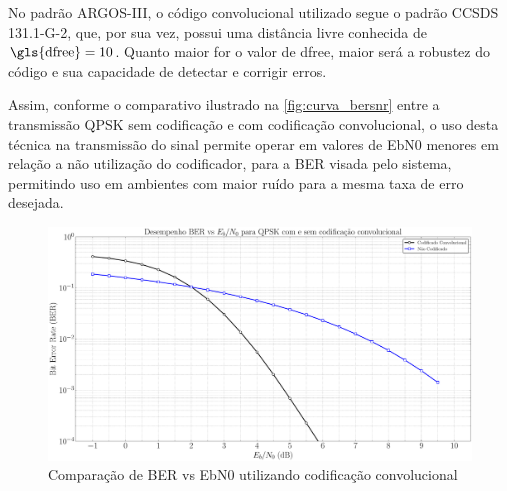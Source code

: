 No padrão \gls{ARGOS-III}, o código convolucional utilizado segue o padrão \gls{CCSDS} 131.1-G-2, que, por sua vez, possui uma distância livre conhecida de $\text{\gls{dfree}} = 10$. Quanto maior for o valor de \gls{dfree}, maior será a robustez do código e sua capacidade de detectar e corrigir erros.

\noindent Assim, conforme o comparativo ilustrado na \autoref{fig:curva_bersnr} entre a transmissão \gls{QPSK} sem codificação e com codificação convolucional, o uso desta técnica na transmissão do sinal permite operar em valores de \gls{EbN0} menores em relação a não utilização do codificador, para a \gls{BER} visada pelo sistema, permitindo uso em ambientes com maior ruído para a mesma taxa de erro desejada.

\begin{figure}[H]
	\centering
	\caption{Comparação de BER vs \gls{EbN0} utilizando codificação convolucional}\label{fig:curva_bersnr}
	\includegraphics[width=\linewidth]{assets/cap2/bersnr.pdf}
\end{figure}